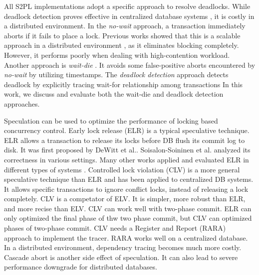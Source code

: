 \documentclass[conference]{IEEEtran}
\begin{document}
All S2PL implementations adopt a specific approach to resolve deadlocks.
While deadlock detection proves effective in centralized database systems \cite{MySQL}\cite{PostgreSQL}, it is costly in a distributed environment.
In the \emph{no-wait}
\cite{EvaluationOfCC:journals/pvldb/HardingAPS17}
approach, a transaction immediately aborts if it fails to place a lock.
Previous works showed that this is a scalable approach in a distributed environment \cite{EvaluationCC1000Cores:journals/pvldb/YuBPDS14}\cite{EvaluationOfCC:journals/pvldb/HardingAPS17},
as it eliminates blocking completely.
However, it performs poorly when dealing with high-contention workload.
Another approach is \emph{wait-die} \cite{LockNoWait:journals/csur/BernsteinG81}.
It avoids some false-positive aborts encountered by \emph{no-wait} by utilizing timestamps.
The \emph{deadlock detection} approach \cite{LockCC:conf/ds/GrayLPT76} detects deadlock by explicitly tracing wait-for relationship among transactions
In this work, we discuss and evaluate both the wait-die and deadlock detection approaches.

Speculation can be used to optimize the performance of locking based concurrency control.
Early lock release (ELR)
\cite{EfficientLocking:conf/vldb/KimuraGK12}
\cite{ELR:dewitt_implementation_1984}
\cite{PS2PL:conf/icdt/Soisalon-SoininenY95}
\cite{Aether:journals/pvldb/JohnsonPSAA10}
\cite{Actor-Oriented-DB:conf/icde/Bernstein18}
is a typical speculative technique.
ELR allows a transaction to release its locks before DB flush its commit log to disk.
It was first proposed by DeWitt et al.\cite{ELR:dewitt_implementation_1984}.
Soisalon-Soininen et al. \cite{PS2PL:conf/icdt/Soisalon-SoininenY95} analyzed its correctness in various settings.
Many other works applied and evaluated ELR in different types of systems
\cite{EfficientLocking:conf/vldb/KimuraGK12}
\cite{Aether:journals/pvldb/JohnsonPSAA10}.
Controlled lock violation (CLV) \cite{CLV:conf/sigmod/GraefeLKTV13} is a more general speculative technique than ELR and has been applied to centralized DB systems.
It allows specific transactions to ignore conflict locks, instead of releasing a lock completely.
CLV is a competator of ELV. It is simpler, more robust than ELR, and more recise than ELV.
CLV can work well with two-phase commit.
ELR can only optimized the final phase of thw two phase commit, but CLV can optimized phases of two-phase commit.
CLV needs a Register and Report (RARA) approach \cite{HeckatonMVCC:journals/pvldb/LarsonBDFPZ11} to implement the tracer.
RARA works well on a centralized database. In a distributed environment, dependency tracing becomes much more costly.
Cascade abort is another side effect of speculation. It can also lead to severe performance downgrade for distributed databases.
\end{document}
